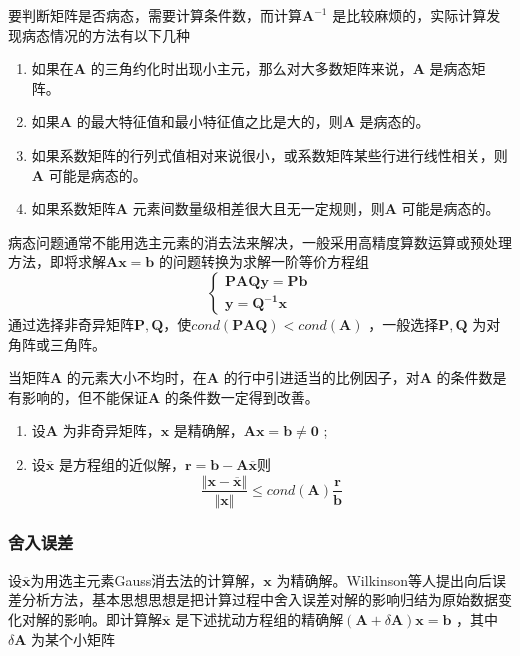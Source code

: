 \documentclass[a4paper]{article}
\begin{document}
要判断矩阵是否病态，需要计算条件数，而计算$\mathbf{A}^{-1}$ 是比较麻烦的，实际计算发现病态情况的方法有以下几种
\begin{enumerate}
	\item 如果在$\mathbf{A}$ 的三角约化时出现小主元，那么对大多数矩阵来说，$\mathbf{A}$ 是病态矩阵。
	\item 如果$\mathbf{A}$ 的最大特征值和最小特征值之比是大的，则$\mathbf{A}$ 是病态的。
	\item 如果系数矩阵的行列式值相对来说很小，或系数矩阵某些行进行线性相关，则$\mathbf{A}$ 可能是病态的。
	\item 如果系数矩阵$\mathbf{A}$ 元素间数量级相差很大且无一定规则，则$\mathbf{A}$ 可能是病态的。
\end{enumerate}

病态问题通常不能用选主元素的消去法来解决，一般采用高精度算数运算或预处理方法，即将求解$\mathbf{Ax} = \mathbf{b}$ 的问题转换为求解一阶等价方程组
\[
\begin{cases}
	\mathbf{PAQy} = \mathbf{Pb} \\
	\mathbf{y} = \mathbf{Q^{-1}x}
\end{cases} 
\] 
通过选择非奇异矩阵$\mathbf{P,Q}$，使$cond(\mathbf{PAQ}) < cond(\mathbf{A})$ ，一般选择$\mathbf{P,Q}$ 为对角阵或三角阵。

当矩阵$\mathbf{A}$ 的元素大小不均时，在$\mathbf{A}$ 的行中引进适当的比例因子，对$\mathbf{A}$ 的条件数是有影响的，但不能保证$\mathbf{A}$ 的条件数一定得到改善。

\begin{theorem}
	\begin{enumerate}
		\item 设$\mathbf{A}$ 为非奇异矩阵，$\mathbf{x}$ 是精确解，$\mathbf{Ax} = \mathbf{b} \neq  \mathbf{0}$ ;
		\item 设$\overline{\mathbf{x}}$ 是方程组的近似解，$\mathbf{r} = \mathbf{b} -  \mathbf{A\overline{x}}$则
			\[
			\frac{\Vert \mathbf{x} - \mathbf{\overline{x}} \Vert}{\Vert \mathbf{x} \Vert} \le cond(\mathbf{A}) \frac{\mathbf{r}}{\mathbf{b}}
			\] 
	\end{enumerate}
\end{theorem}

\subsubsection{舍入误差}
设$\overline{\mathbf{x}}$为用选主元素Gauss消去法的计算解，$\mathbf{x}$ 为精确解。Wilkinson等人提出向后误差分析方法，基本思想思想是把计算过程中舍入误差对解的影响归结为原始数据变化对解的影响。即计算解$\mathbf{\overline{x}}$ 是下述扰动方程组的精确解$(\mathbf{A} + \delta \mathbf{A}) \mathbf{x} = \mathbf{b}$ ，其中$\delta \mathbf{A}$ 为某个小矩阵
\end{document}
